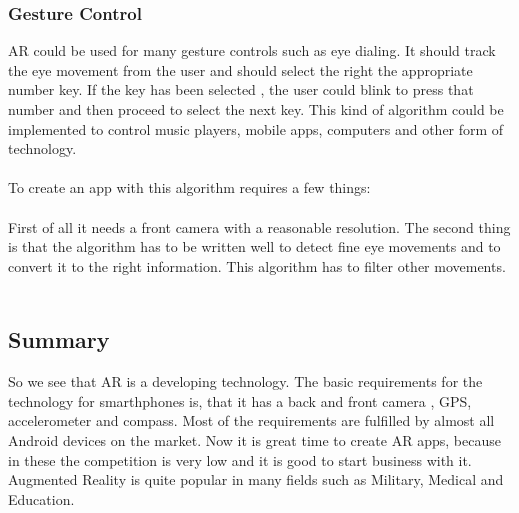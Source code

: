  \subsubsection{Gesture Control}
 AR could be used for many gesture controls such as eye dialing.   It should track the eye movement from the user and should select the right the appropriate number key. If the key has been selected , the user could blink to press that number and then proceed to select the next key. This kind of algorithm could be implemented to control music players, mobile apps, computers and other form of technology.\cite{AugmentedBook}
 \\
 \\
 To create an app with this algorithm requires a few things:
 \\
 \\
 First of all it needs a front camera with a reasonable resolution. The second thing is that the algorithm has to be written well to detect fine eye movements  and to convert it to the right information. This algorithm has to filter other movements.
 \\
 \\
 \subsection{Summary}
 So we see that AR is a developing technology. The basic requirements for the technology for smarthphones is, that it has a back and front camera , GPS, accelerometer and compass. Most of the requirements are fulfilled by almost all Android devices on the market. Now it is great time to create AR apps, because in these the competition is very low and it is good to start business with it. Augmented Reality is quite popular in many fields such as Military, Medical and Education.
 \\
 
